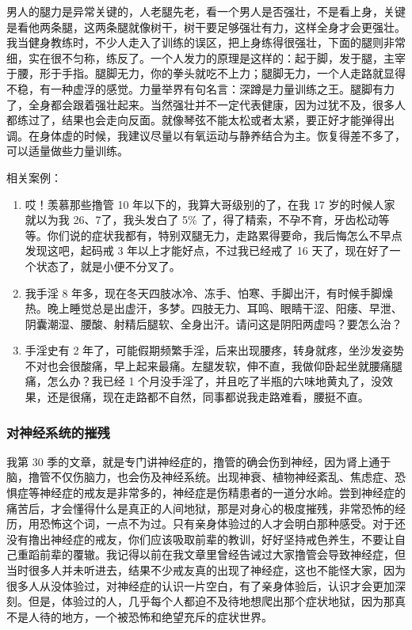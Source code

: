 \documentclass{ctexart}
\begin{document}
男人的腿力是异常关键的，人老腿先老，看一个男人是否强壮，不是看上身，关键是看他两条腿，这两条腿就像树干，树干要足够强壮有力，这样全身才会更强壮。我当健身教练时，不少人走入了训练的误区，把上身练得很强壮，下面的腿则非常细，实在很不匀称，练反了。一个人发力的原理是这样的：起于脚，发于腿，主宰于腰，形于手指。腿脚无力，你的拳头就吃不上力；腿脚无力，一个人走路就显得不稳，有一种虚浮的感觉。力量举界有句名言：深蹲是力量训练之王。腿脚有力了，全身都会跟着强壮起来。当然强壮并不一定代表健康，因为过犹不及，很多人都练过了，结果也会走向反面。就像琴弦不能太松或者太紧，要正好才能弹得出调。在身体虚的时候，我建议尽量以有氧运动与静养结合为主。恢复得差不多了，可以适量做些力量训练。

相关案例：

\begin{enumerate}
    \item 哎！羡慕那些撸管 10 年以下的，我算大哥级别的了，在我 17 岁的时候人家就以为我 26、7了，我头发白了 5\% 了，得了精索，不孕不育，牙齿松动等等。你们说的症状我都有，特别双腿无力，走路累得要命，我后悔怎么不早点发现这吧，起码戒 3 年以上才能好点，不过我已经戒了 16 天了，现在好了一个状态了，就是小便不分叉了。
    \item 我手淫 8 年多，现在冬天四肢冰冷、冻手、怕寒、手脚出汗，有时候手脚燥热。晚上睡觉总是出虚汗，多梦。四肢无力、耳鸣、眼睛干涩、阳痿、早泄、阴囊潮湿、腰酸、射精后腿软、全身出汗。请问这是阴阳两虚吗？要怎么治？
    \item 手淫史有 2 年了，可能假期频繁手淫，后来出现腰疼，转身就疼，坐沙发姿势不对也会很酸痛，早上起来最痛。左腿发软，伸不直，我做仰卧起坐就腰痛腿痛，怎么办？我已经 1 个月没手淫了，并且吃了半瓶的六味地黄丸了，没效果，还是很痛，现在走路都不自然，同事都说我走路难看，腰挺不直。
\end{enumerate}

\subsubsection{对神经系统的摧残}

我第 30 季的文章，就是专门讲神经症的，撸管的确会伤到神经，因为肾上通于脑，撸管不仅伤脑力，也会伤及神经系统。出现神衰、植物神经紊乱、焦虑症、恐惧症等神经症的戒友是非常多的，神经症是伤精患者的一道分水岭。尝到神经症的痛苦后，才会懂得什么是真正的人间地狱，那是对身心的极度摧残，非常恐怖的经历，用恐怖这个词，一点不为过。只有亲身体验过的人才会明白那种感受。对于还没有撸出神经症的戒友，你们应该吸取前辈的教训，好好坚持戒色养生，不要让自己重蹈前辈的覆辙。我记得以前在我文章里曾经告诫过大家撸管会导致神经症，但当时很多人并未听进去，结果不少戒友真的出现了神经症，这也不能怪大家，因为很多人从没体验过，对神经症的认识一片空白，有了亲身体验后，认识才会更加深刻。但是，体验过的人，几乎每个人都迫不及待地想爬出那个症状地狱，因为那真不是人待的地方，一个被恐怖和绝望充斥的症状世界。
\end{document}

